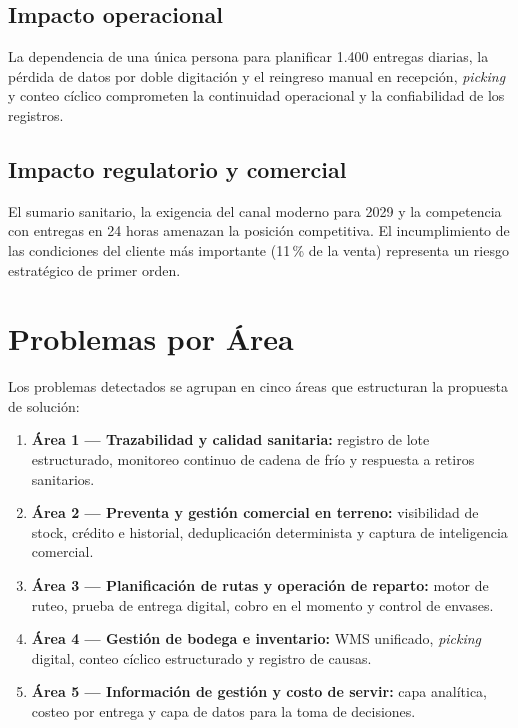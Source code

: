 \subsection{Impacto operacional}

La dependencia de una única persona para planificar 1.400 entregas diarias, la pérdida
de datos por doble digitación y el reingreso manual en recepción, \emph{picking} y conteo
cíclico comprometen la continuidad operacional y la confiabilidad de los registros.

\subsection{Impacto regulatorio y comercial}

El sumario sanitario, la exigencia del canal moderno para 2029 y la competencia con
entregas en 24 horas amenazan la posición competitiva. El incumplimiento de las
condiciones del cliente más importante (11\,\% de la venta) representa un riesgo
estratégico de primer orden.

\section{Problemas por Área}

Los problemas detectados se agrupan en cinco áreas que estructuran la propuesta de
solución:

\begin{enumerate}
  \item \textbf{Área 1 — Trazabilidad y calidad sanitaria:} registro de lote
        estructurado, monitoreo continuo de cadena de frío y respuesta a retiros
        sanitarios.
  \item \textbf{Área 2 — Preventa y gestión comercial en terreno:} visibilidad de stock,
        crédito e historial, deduplicación determinista y captura de inteligencia
        comercial.
  \item \textbf{Área 3 — Planificación de rutas y operación de reparto:} motor de
        ruteo, prueba de entrega digital, cobro en el momento y control de envases.
  \item \textbf{Área 4 — Gestión de bodega e inventario:} WMS unificado, \emph{picking}
        digital, conteo cíclico estructurado y registro de causas.
  \item \textbf{Área 5 — Información de gestión y costo de servir:} capa analítica,
        costeo por entrega y capa de datos para la toma de decisiones.
\end{enumerate}

